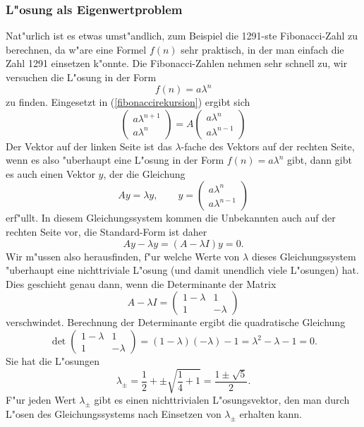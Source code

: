 \subsubsection{L"osung als Eigenwertproblem}
Nat"urlich ist es etwas umst"andlich, zum Beispiel die 1291-ste Fibonacci-Zahl
zu berechnen, da w"are eine Formel $f(n)$ sehr praktisch, in der man einfach
die Zahl 1291 einsetzen k"onnte.
Die Fibonacci-Zahlen nehmen sehr schnell zu, 
wir versuchen die L"osung in der Form
\[
f(n)=a\lambda^n
\]
zu finden. Eingesetzt in (\ref{fibonaccirekursion}) ergibt sich
\[
\begin{pmatrix}a\lambda^{n+1}\\a\lambda^n\end{pmatrix}
=A\begin{pmatrix}a\lambda^n\\a\lambda^{n-1}\end{pmatrix}
\]
Der Vektor auf der linken Seite ist das $\lambda$-fache des Vektors
auf der rechten Seite, wenn es also "uberhaupt eine L"osung in der
Form $f(n)=a\lambda^n$ gibt, dann gibt es auch einen Vektor $y$, der
die Gleichung
\begin{equation}
Ay=\lambda y, \qquad y=\begin{pmatrix}
a\lambda^n\\a\lambda^{n-1}
\end{pmatrix}
\end{equation}
erf"ullt. In diesem Gleichungssystem kommen die Unbekannten auch auf
der rechten Seite vor, die Standard-Form ist daher
\[
Ay-\lambda y=(A-\lambda I)y=0.
\]
Wir m"ussen also herausfinden, f"ur welche Werte von $\lambda$ dieses
Gleichungssystem "uberhaupt eine nichttriviale L"osung (und damit unendlich
viele L"osungen) hat. Dies geschieht genau dann, wenn die Determinante
der Matrix
\[
A-\lambda I=\begin{pmatrix}1-\lambda&1\\1&-\lambda\end{pmatrix}
\]
verschwindet. Berechnung der
Determinante ergibt die quadratische Gleichung
\[
\det
\begin{pmatrix}1-\lambda&1\\1&-\lambda\end{pmatrix}
=(1-\lambda)(-\lambda)-1=\lambda^2-\lambda-1=0.
\]
Sie hat die L"osungen
\[
\lambda_{\pm}=\frac12+\pm\sqrt{\frac14+1}=\frac{1\pm\sqrt{5}}2.
\]
F"ur jeden Wert $\lambda_{\pm}$ gibt es einen nichttrivialen
L"osungsvektor, den man durch L"osen des Gleichungssystems nach
Einsetzen von $\lambda_{\pm}$ erhalten kann. 

